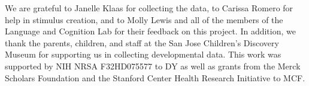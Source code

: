 \documentclass[man,floatsintext]{apa6}
\begin{document}
We are grateful to Janelle Klaas for collecting the data, to Carissa Romero for help in stimulus creation, and to Molly Lewis and all of the members of the Language and Cognition Lab for their feedback on this project. In addition, we thank the parents, children, and staff at the San Jose Children's Discovery Museum for supporting us in collecting developmental data. This work was supported by NIH NRSA F32HD075577 to DY as well as grants from the Merck Scholars Foundation and the Stanford Center Health Research Initiative to MCF.



\end{document}
